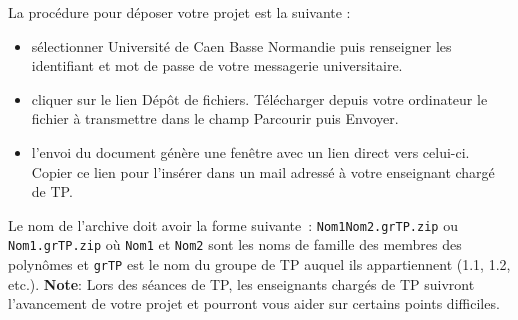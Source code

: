 \documentclass[10pt]{article}
\begin{document}
La procédure pour déposer votre projet est la suivante :
\begin{itemize}
\item sélectionner Université de Caen Basse Normandie puis renseigner les identifiant et mot de passe de votre messagerie universitaire.
\item cliquer sur le lien Dépôt de fichiers. Télécharger depuis votre ordinateur le fichier à transmettre dans le champ Parcourir puis Envoyer. 
\item l'envoi du document génère une fenêtre avec un lien direct vers celui-ci. Copier ce lien pour l'insérer dans un mail adressé à votre enseignant chargé de TP. 
\end{itemize}
\noindent
Le nom de l'archive doit avoir la forme suivante~: \texttt{Nom1Nom2.grTP.zip} ou 
\texttt{Nom1.grTP.zip} où \texttt{Nom1} et \texttt{Nom2} sont les noms de 
famille des membres des polynômes et \texttt{grTP} est le nom du groupe de TP 
auquel ils appartiennent (1.1, 1.2, etc.).
\noindent
{\bf Note}: Lors des séances de TP, les enseignants chargés de TP suivront l'avancement de votre projet et pourront vous aider sur certains points difficiles.
\end{document}
